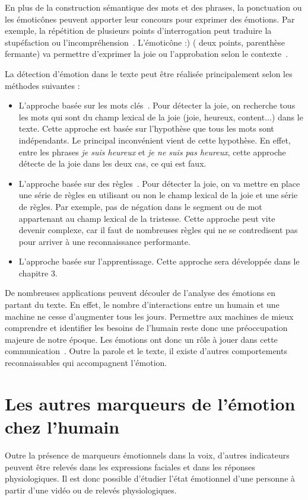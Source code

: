 En plus de la construction sémantique des mots et des phrases, la ponctuation ou les émoticônes peuvent apporter leur concours pour exprimer des émotions. Par exemple, la répétition de plusieurs points d'interrogation peut traduire la stupéfaction ou l'incompréhension~\cite{Thurlow2013}. L’émoticône :) ( deux points, parenthèse fermante) va permettre d'exprimer la joie ou l'approbation selon le contexte~\cite{Provine2007}.

La détection d'émotion dans le texte peut être réalisée principalement selon les méthodes suivantes :
\begin{itemize}
  \item L'approche basée sur les mots clés~\cite{Ma2005,Liu2003}. Pour détecter la joie, on recherche tous les mots qui sont du champ lexical de la joie (joie, heureux, content...) dans le texte. Cette approche est basée sur l'hypothèse que tous les mots sont indépendants. Le principal inconvénient vient de cette hypothèse. En effet, entre les phrases \textit{je suis heureux} et \textit{je ne suis pas heureux}, cette approche détecte de la joie dans les deux cas, ce qui est faux.
  \item L'approche basée sur des règles~\cite{AlMasum2007,Chaumartin2007}. Pour détecter la joie, on va mettre en place une série de règles en utilisant ou non le champ lexical de la joie et une série de règles. Par exemple, pas de négation dans le segment ou de mot appartenant au champ lexical de la tristesse. Cette approche peut vite devenir complexe, car il faut de nombreuses règles qui ne se contredisent pas pour arriver à une reconnaissance performante.
  \item L'approche basée sur l'apprentissage. Cette approche sera développée dans le chapitre 3.
\end{itemize}

De nombreuses applications peuvent découler de l'analyse des émotions en partant du texte. En effet, le nombre d’interactions entre un humain et une machine ne cesse d'augmenter tous les jours. Permettre aux machines de mieux comprendre et identifier les besoins de l'humain reste donc une préoccupation majeure de notre époque. Les émotions ont donc un rôle à jouer dans cette communication~\cite{Picard2000}. Outre la parole et le texte, il existe d'autres comportements reconnaissables qui accompagnent l'émotion.

\section{Les autres marqueurs de l'émotion chez l'humain}
Outre la présence de marqueurs émotionnels dans la voix, d'autres indicateurs peuvent être relevés dans les expressions faciales et dans les réponses physiologiques. Il est donc possible d'étudier l'état émotionnel d'une personne à partir d'une vidéo ou de relevés physiologiques.

